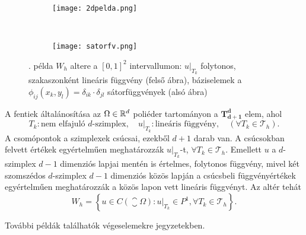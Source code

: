 \begin{figure}[h!]
	\begin{subfigure}{\textwidth}
		\centerline{\texttt{[image: 2dpelda.png]}}
		\label{fig:linu2d}
	\end{subfigure}\\
	\begin{subfigure}{\textwidth}
		\centerline{\texttt{[image: satorfv.png]}}
		\label{fig:sator2d}
	\end{subfigure}
	\caption{. példa $W_h$ altere a $[0,1]^2$ intervallumon: $u|_{T_k}$ folytonos, szakaszonként lineáris függvény (felső ábra), báziselemek a $\phi_{ij}(x_k,y_l) = \delta_{ik} \cdot \delta_{jl}$ sátorfüggvények (alsó ábra)}
	\label{fig:2dlinearis}
\end{figure}

\begin{example}\label{ddpelda}
	A fentiek általánosítása az $\Omega \in \mathbb{R}^d$ poliéder tartományon a $\mathbf{T_{d+1}^d}$ elem, ahol
	\begin{equation*}
		T_k: \text{nem elfajuló $d$-szimplex}, \quad u|_{T_k}: \text{lineáris függvény}, \quad (\forall T_k \in \mathcal{T}_h). 
	\end{equation*}
	A csomópontok a szimplexek csúcsai, ezekből $d+1$ darab van. A csúcsokban felvett értékek egyértelműen meghatározzák $u|_{T_k}$-t, $\forall  T_k \in \mathcal{T}_h$. Emellett $u$ a $d$-szimplex $d-1$ dimenziós lapjai mentén is értelmes, folytonos függvény, mivel két szomszédos $d$-szimplex  $d-1$ dimenziós közös lapján a csúcsbeli függvényértékek egyértelműen meghatározzák a közös lapon vett lineáris függvényt.  Az altér tehát
	\begin{equation*}
		W_h = \left\{ u \in C(\closure{\Omega}): u|_{T_k} \in P^1, \forall T_k \in \mathcal{T}_h  \right\}.
	\end{equation*}
\end{example}

További példák találhatók végeselemekre  jegyzetekben.




